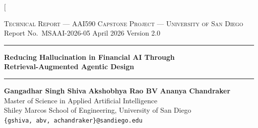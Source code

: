 \documentclass[10pt,twocolumn]{article}
\begin{document}
\twocolumn[{%
\begin{@twocolumnfalse}
\begin{center}
  {\small\textsc{Technical Report --- AAI590 Capstone Project ---
    University of San Diego}}\\[2pt]
  {\small Report No.\ MSAAI-2026-05 \quad April 2026 \quad Version 2.0}
  \vspace{8pt}

  \rule{\linewidth}{1pt}
  \vspace{6pt}

  {\LARGE\bfseries Reducing Hallucination in Financial AI Through\\
    Retrieval-Augmented Agentic Design}

  \vspace{10pt}
  \rule{\linewidth}{0.4pt}
  \vspace{8pt}

  {\normalsize
    \textbf{Gangadhar Singh Shiva} \quad
    \textbf{Akshobhya Rao BV} \quad
    \textbf{Ananya Chandraker}\\[4pt]
    Master of Science in Applied Artificial Intelligence\\
    Shiley Marcos School of Engineering, University of San Diego\\
    \texttt{\{gshiva, abv, achandraker\}@sandiego.edu}}

  \vspace{10pt}


\end{center}
\end{@twocolumnfalse}}
\end{document}
